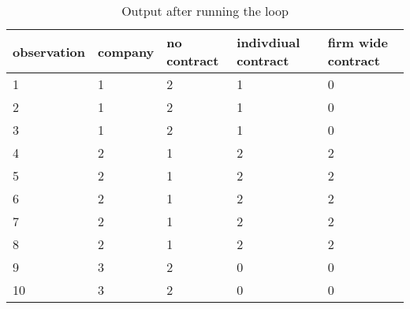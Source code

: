 \begin{table}[h!]
\centering
\caption{Output after running the loop}
\label{label}
\begin{tabular}{|l|l|l|l|l|}
\hline
observation & company & no contract & indivdiual contract & firm wide contract \\ \hline
1           & 1       & 2           & 1                   & 0                  \\ \hline
2           & 1       & 2           & 1                   & 0                  \\ \hline
3           & 1       & 2           & 1                   & 0                  \\ \hline
4           & 2       & 1           & 2                   & 2                  \\ \hline
5           & 2       & 1           & 2                   & 2                  \\ \hline
6           & 2       & 1           & 2                   & 2                  \\ \hline
7           & 2       & 1           & 2                   & 2                  \\ \hline
8           & 2       & 1           & 2                   & 2                  \\ \hline
9           & 3       & 2           & 0                   & 0                  \\ \hline
10          & 3       & 2           & 0                   & 0                  \\ \hline
\end{tabular}
\end{table}

